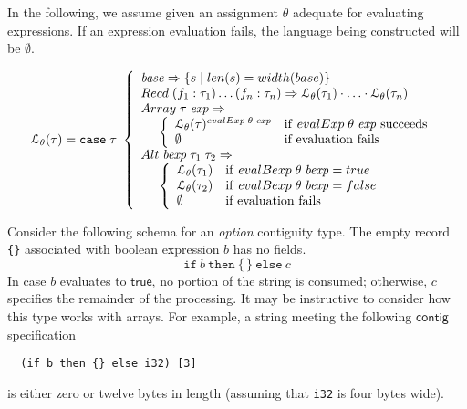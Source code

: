 \documentclass[a4paper,UKenglish,cleveref, autoref, thm-restate]{lipics-v2021}
\newcommand{\konst}[1]{\ensuremath{\mathsf{#1}}}
\newcommand{\set}[1]{\ensuremath{\{ {#1} \}}}
\newcommand{\LangTheta}[1]{\ensuremath{{\mathcal L}_{\theta}({#1})}}
\newcommand{\itelse}[3]{\mbox{$\mathtt{if}\ {#1}\ \mathtt{then}\ {#2}\ \mathtt{else}\ {#3}$}}
\begin{document}
\begin{definition}

 In the following, we assume given an assignment $\theta$ adequate for
 evaluating expressions. If an expression evaluation fails, the
 language being constructed will be $\emptyset$.

\[
\LangTheta{\tau} =
\mathtt{case}\; \tau\
 \left\{
 \begin{array}{l}
 \mathit{base} \Rightarrow \set{s \mid \konst{len}(s) = \konst{width}(base)} \\
 \konst{Recd}\; (f_1 : \tau_1) \ldots (f_n : \tau_n)
      \Rightarrow \LangTheta{\tau_1} \cdot \ldots \cdot \LangTheta{\tau_n}
\\
 \konst{Array}\; \tau \; \mathit{exp} \Rightarrow  \\
  \hspace*{5mm}
 \left\{
 \begin{array}{ll}
    \LangTheta{\tau}^{\konst{evalExp}\;\theta\;\mathit{exp}} &
       \mathrm{if}\ \konst{evalExp}\;\theta\;\mathit{exp}\ \mathrm{succeeds} \\
    \emptyset & \text{if evaluation fails}
 \end{array}
 \right.
\\
 \konst{Alt}\; \mathit{bexp}\;\tau_1\; \tau_2 \Rightarrow \\
  \hspace*{5mm}
 \left\{
 \begin{array}{ll}
    \LangTheta{\tau_1} & \mathrm{if}\ \konst{evalBexp}\;\theta\;\mathit{bexp} = \konst{true} \\
    \LangTheta{\tau_2} & \mathrm{if}\ \konst{evalBexp}\;\theta\;\mathit{bexp} = \konst{false} \\
    \emptyset          & \text{if evaluation fails}
 \end{array}
 \right.
 \\
\end{array}
 \right.
\]
\end{definition}

\begin{example}
Consider the following schema for an \emph{option} contiguity
type. The empty record \verb+{}+ associated with boolean expression
$b$ has no fields.
\[ \itelse{b}{\{\,\}}{c} \]
In case $\mathit{b}$ evaluates to \konst{true}, no portion of the
string is consumed; otherwise, $c$ specifies the remainder of the
processing. It may be instructive to consider how this type works with
arrays. For example, a string meeting the following \konst{contig} specification

{\small
\begin{verbatim}
  (if b then {} else i32) [3]
\end{verbatim}
}

\noindent is either zero or twelve bytes in length (assuming that
\verb+i32+ is four bytes wide).

\end{example}
\end{document}
